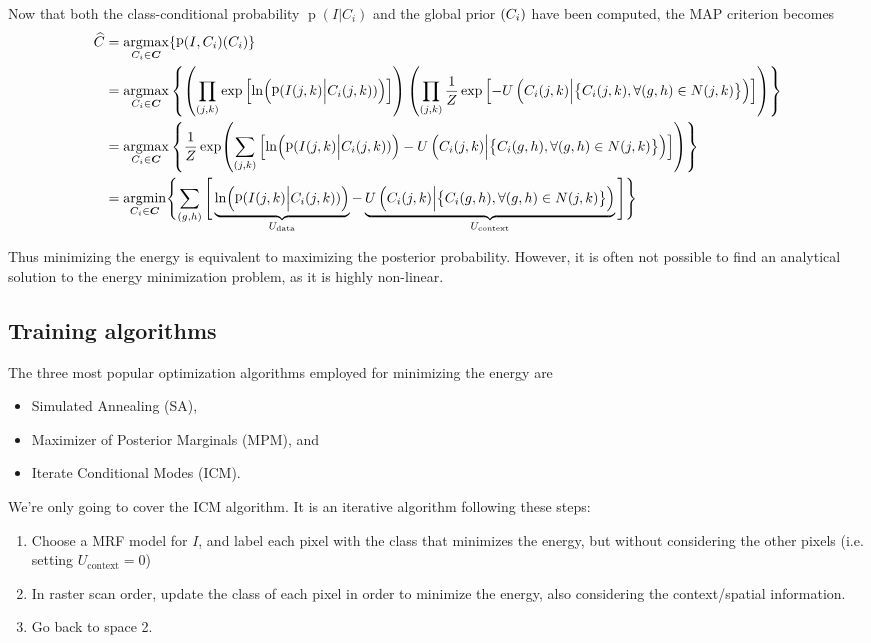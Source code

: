 \documentclass[oneside,onecolumn]{report}
\DeclareMathOperator*{\argmax}{argmax}
\DeclareMathOperator*{\argmin}{argmin}
\DeclareMathOperator*{\pdf}{p}
\let\P\relax
\DeclareMathOperator*{\P}{P}
\begin{document}
Now that both the class-conditional probability $\pdf(I | C_i)$ and the global prior $\P(C_i)$ have been computed, the MAP criterion becomes
\begin{align*}
    \widehat C
    &= \argmax_{C_i \in \bm C}\{ \pdf(I, C_i) \P(C_i) \} \\
    &= \argmax_{C_i \in \bm C}
    \left\{
        \left( \prod_{(j, k)} \exp\left[\ln(\pdf(I(j, k) \Big| C_i(j, k)))\right] \right)
        \left( \prod_{(j, k)} \frac{1}{Z} \exp\left[-U \left( C_i(j, k) \Big| \big\{ C_i(j, k), \forall (g, h) \in N(j, k) \big\} \right)\right] \right)
    \right\} \\
    &= \argmax_{C_i \in \bm C}
    \left\{
    \frac{1}{Z}
    \exp(
        \sum_{(j, k)} \left[
            \ln(\pdf(I(j, k) \Big| C_i(j, k)))
            -U \left( C_i(j, k) \Big| \big\{ C_i(g, h), \forall (g, h) \in N(j, k) \big\} \right)
        \right]
    )
    \right\} \\
    &= \argmin_{C_i \in \bm C}
    \Biggl\{
        \sum_{(g, h)} \Bigg[
            \underbrace{\ln(\pdf(I(j, k) \Big| C_i(j, k)))}_{U_\text{data}}
            -
            \underbrace{U \left( C_i(j, k) \Big| \big\{ C_i(g, h), \forall (g, h) \in N(j, k) \big\} \right)}_{U_\text{context}}
        \Bigg]
    \Biggr\}
\end{align*}

Thus minimizing the energy is equivalent to maximizing the posterior probability.
However, it is often not possible to find an analytical solution to the energy minimization problem, as it is highly non-linear.


\subsection{Training algorithms}
The three most popular optimization algorithms employed for minimizing the energy are
\begin{itemize}
    \item Simulated Annealing (SA),
    \item Maximizer of Posterior Marginals (MPM), and
    \item Iterate Conditional Modes (ICM).
\end{itemize}

We're only going to cover the ICM algorithm.
It is an iterative algorithm following these steps:
\begin{enumerate}
    \item Choose a MRF model for $I$, and label each pixel with the class that minimizes the energy, but without considering the other pixels (i.e. setting $U_\text{context} = 0$)
    \item In raster scan order, update the class of each pixel in order to minimize the energy, also considering the context/spatial information.
    \item Go back to space 2.
\end{enumerate}
\end{document}
